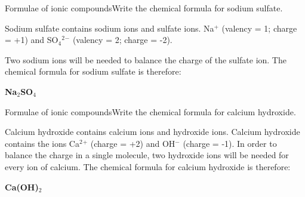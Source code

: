 \begin{wex}{Formulae of ionic compounds}{Write the chemical formula for sodium sulfate.\\}
{
Sodium sulfate contains sodium ions and sulfate ions.
Na$^+$ (valency = 1; charge = +1) and SO$_4$$^2$$^-$ (valency = 2; charge = -2).

Two sodium ions will be needed to balance the charge of the sulfate ion. The chemical formula for sodium sulfate is therefore:

\begin{center}
\textbf{Na$_2$SO$_4$}
\end{center}}
\end{wex}

\begin{wex}{Formulae of ionic compounds}{Write the chemical formula for calcium hydroxide.\\}
{
Calcium hydroxide contains calcium ions and hydroxide ions.
Calcium hydroxide contains the ions Ca$^2$$^+$ (charge = +2) and OH$^-$ (charge = -1). In order to balance the charge in a single molecule, two hydroxide ions will be needed for every ion of calcium.
The chemical formula for calcium hydroxide is therefore:

\begin{center}
\textbf{Ca(OH)$_2$}
\end{center}}
\end{wex}

